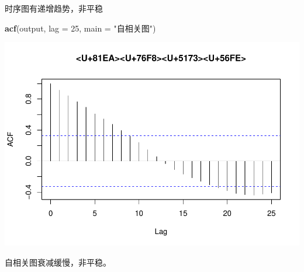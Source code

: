 \documentclass[]{article}
\newenvironment{Shaded}{\begin{snugshade}}{\end{snugshade}}
\newcommand{\DataTypeTok}[1]{\textcolor[rgb]{0.13,0.29,0.53}{#1}}
\newcommand{\DecValTok}[1]{\textcolor[rgb]{0.00,0.00,0.81}{#1}}
\newcommand{\KeywordTok}[1]{\textcolor[rgb]{0.13,0.29,0.53}{\textbf{#1}}}
\newcommand{\NormalTok}[1]{#1}
\newcommand{\StringTok}[1]{\textcolor[rgb]{0.31,0.60,0.02}{#1}}
\begin{document}
时序图有递增趋势，非平稳

\begin{Shaded}
\begin{Highlighting}[]
\KeywordTok{acf}\NormalTok{(output, }\DataTypeTok{lag =} \DecValTok{25}\NormalTok{,}
    \DataTypeTok{main =} \StringTok{"自相关图"}\NormalTok{)}
\end{Highlighting}
\end{Shaded}

\includegraphics{timeseries_files/figure-latex/2.1acf-1.pdf}

自相关图衰减缓慢，非平稳。
\end{document}
